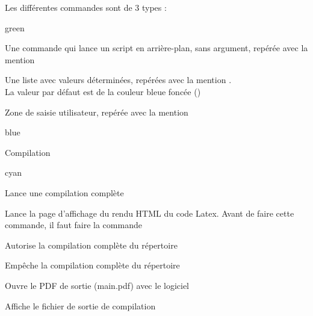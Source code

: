 {Les différentes commandes sont de 3 types :

\begin{items}{green}{\faviconLeaf}
\item Une commande qui lance un script en arrière-plan, sans argument, repérée avec la mention 
\item Une liste avec valeurs déterminées, repérées avec la mention .\\La valeur par défaut est de la couleur bleue foncée ()
\item Zone de saisie utilisateur, repérée avec la mention 
\end{items}

\begin{items}{blue}{\Triangle}

    \item Compilation
    \begin{items}{cyan}{\Triangle}
        \item {}

        Lance une compilation complète\\ 
        \item {}

        Lance la page d'affichage du rendu HTML du code Latex. Avant de faire cette commande, il faut faire la commande \\ 
        \item  {}

        Autorise la compilation complète du répertoire \\ 
        \item  {}

        Empêche la compilation complète du répertoire \\ 
        \item  {}

        Ouvre le PDF de sortie (main.pdf) avec le logiciel \\ 
        \item  {}

        Affiche le fichier de sortie de compilation\\ 
        \item  {}


\end{items}
\end{items}}
